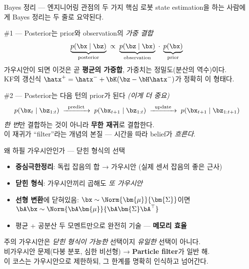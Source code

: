 \begin{frame}{Bayes 정리 — 엔지니어링 관점의 두 가지 핵심}
  로봇 state estimation을 하는 사람에게 Bayes 정리는 두 줄로 요약된다.

  \vspace{0.6em}
  \begin{block}{\#1 — Posterior는 prior와 observation의 \emph{가중 결합}}
    \[
      \underbrace{p(\bx \mid \bz)}_{\text{posterior}}
      \;\propto\;
      \underbrace{p(\bz \mid \bx)}_{\text{observation}}
      \;\cdot\;
      \underbrace{p(\bx)}_{\text{prior}}
    \]
    가우시안이 되면 이것은 곧 \textbf{평균의 가중합}, 가중치는 정밀도(분산의 역수)이다.\\
    KF의 갱신식 $\hatx^+ = \hatx^- + \bK(\bz - \bH\hatx^-)$가 정확히 이 형태다.
  \end{block}

  \pause
  \vspace{0.4em}
  \begin{alertblock}{\#2 — Posterior는 다음 턴의 prior가 된다 \emph{(이게 더 중요)}}
    \[
      p(\bx_t \mid \bz_{1:t}) \;\xrightarrow{\;\;\text{predict}\;\;}\;
      p(\bx_{t+1} \mid \bz_{1:t}) \;\xrightarrow{\;\;\text{update}\;\;}\;
      p(\bx_{t+1} \mid \bz_{1:t+1})
    \]
    \emph{한 번}만 결합하는 것이 아니라 \textbf{무한 재귀}로 결합한다.\\
    이 재귀가 ``filter''라는 개념의 본질 — 시간을 따라 belief가 \emph{흐른다}.
  \end{alertblock}
\end{frame}

\begin{frame}{왜 하필 가우시안인가 — 닫힌 형식의 선택}
  \begin{itemize}
    \item \textbf{중심극한정리}: 독립 잡음의 합 → 가우시안 (실제 센서 잡음의 좋은 근사)
    \item \textbf{닫힌 형식}: 가우시안끼리 곱해도 \emph{또 가우시안}
    \item \textbf{선형 변환}에 닫혀있음: $\bx \sim \Norm{\bm{\mu}}{\bm{\Sigma}}$이면
          $\bA\bx \sim \Norm{\bA\bm{\mu}}{\bA\bm{\Sigma}\bA^\top}$
    \item 평균 + 공분산 두 모멘트만으로 완전히 기술 — \textbf{메모리 효율}
  \end{itemize}
  \pause
  \vspace{0.5em}
  \begin{alertblock}{주의}
    가우시안은 \emph{닫힌 형식이 가능한} 선택이지 \emph{유일한} 선택이 아니다.\\
    비가우시안 문제(다봉 분포, 심한 비선형) → \textbf{Particle filter}가 일반 해.\\
    이 코스는 가우시안으로 제한하되, 그 한계를 명확히 인식하고 넘어간다.
  \end{alertblock}
\end{frame}

